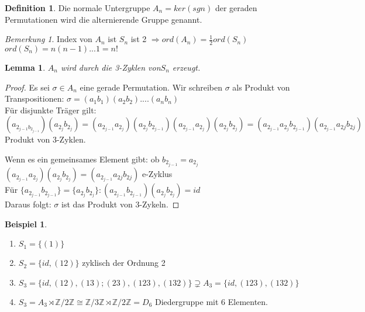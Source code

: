\documentclass[12pt]{scrartcl}%
\newtheorem{lemma}{Lemma}
\theoremstyle{definition}
\newtheorem*{defn}{Definition}
\newtheorem{ex}{Beispiel}
\theoremstyle{remark}
\newtheorem*{nb}{Bemerkung}
\begin{document}
	\begin{defn}
	Die normale Untergruppe $A_n=ker(sgn)$ der geraden Permutationen wird die alternierende Gruppe genannt.
	\end{defn}
	
	\begin{nb}
	Index von $A_n$ ist $S_n$ ist 2 $\Rightarrow ord(A_n)=\frac{1}{2}ord(S_n)$\\
	$ord(S_n)=n(n-1)...1=n!$
	\end{nb}
	
	\begin{lemma}
	$A_n$ wird durch die 3-Zyklen von$S_n$ erzeugt.
	\end{lemma}
	
	\begin{proof}
	Es sei $\sigma \in A_n$ eine gerade Permutation. Wir schreiben $\sigma$ als Produkt von Transpositionen:
	$\sigma =(a_1b_1)(a_2b_2)....(a_nb_n)$\\
	Für disjunkte Träger gilt:\\
	$(a_{2_{j-1}b_{2_{j-1}}})(a_{2_j}b_{2_j})=(a_{2_{j-1}}a_{2_j})(a_{2_j}b_{2_{j-1}})(a_{2_{j-1}}a_{2_j})(a_{2_j}b_{2_j})=(a_{2_{j-1}}a_{2_j}b_{2_{j-1}})(a_{2_{j-1}}a_{2j}b_{2j})$\\
	Produkt von 3-Zyklen.
	
	Wenn es ein gemeinsames Element gibt: ob $b_{2_{j-1}}=a_{2_j}$\\
	$(a_{2_{j-1}}a_{2_j})(a_{2_j}b_{2_j})=(a_{2_{j-1}}a_{2j}b_{2j})$ e-Zyklus\\
	Für $\{ a_{2_{j-1}}b_{2_{j-1}}\} =\{ a_{2_j}b_{2_j} \} : (a_{2_{j-1}}b_{2_{j-1}})(a_{2_j}b_{2_j})=id$\\
	Daraus folgt: $\sigma$ ist das Produkt von 3-Zykeln.
	\end{proof}
	
	\begin{ex}
	\begin{enumerate}
		\item $S_1=\{ (1)\}$
		\item $S_2=\{ id, (12)\}$ zyklisch der Ordnung 2
		\item $S_3=\{ id,(12),(13);(23),(123),(132)\} \supsetneq A_3=\{ id,(123),(132)\}$
		\item $S_3=A_3\rtimes \mathbb{Z}/2\mathbb{Z} \cong  \mathbb{Z}/3\mathbb{Z} \rtimes \mathbb{Z}/2\mathbb{Z} = D_6$ Diedergruppe mit 6 Elementen.
	\end{enumerate}
	\end{ex}
	 
\end{document}
